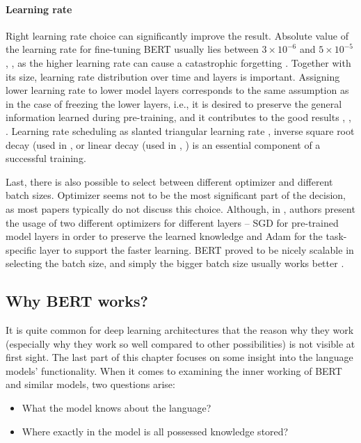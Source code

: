 \paragraph{Learning rate} Right learning rate choice can significantly improve the result. Absolute value of the learning rate for fine-tuning BERT usually lies between $3 \times 10^{-6}$ and $5\times 10^{-5}$ \citep{Devlin2019}, \citep{Virtanen2019}, \citep{Kittask2020} as the higher learning rate can cause a catastrophic forgetting \citep{Sun}. Together with its size, learning rate distribution over time and layers is important. Assigning lower learning rate to lower model layers corresponds to the same assumption as in the case of freezing the lower layers, i.e., it is desired to preserve the general information learned during pre-training, and it contributes to the good results \citep{Ruder2018}, \citep{Sun}, \citep{Kondratyuk2019}. Learning rate scheduling as slanted triangular learning rate \citep{Ruder2018}, inverse square root decay (used in \citep{Kondratyuk2019}, \citep{Raffel2019} or linear decay (used in \citep{Liu2019}, \citep{Clark2020}) is an essential component of a successful training.
\par
Last, there is also possible to select between different optimizer and different batch sizes. Optimizer seems not to be the most significant part of the decision, as most papers typically do not discuss this choice. Although, in \citep{Chronopoulou2019}, authors present the usage of two different optimizers for different layers -- SGD for pre-trained model layers in order to preserve the learned knowledge and Adam \citep{Kingma2015} for the task-specific layer to support the faster learning. BERT proved to be nicely scalable in selecting the batch size, and simply the bigger batch size usually works better \citep{Liu2019}.
\subsection{Why BERT works?}
\label{sub:specialBert}
It is quite common for deep learning architectures that the reason why they work (especially why they work so well compared to other possibilities) is not visible at first sight. The last part of this chapter focuses on some insight into the language models' functionality. When it comes to examining the inner working of BERT and similar models, two questions arise:
\begin{itemize}
\item What the model knows about the language?
\item Where exactly in the model is all possessed knowledge stored?
\end{itemize}

